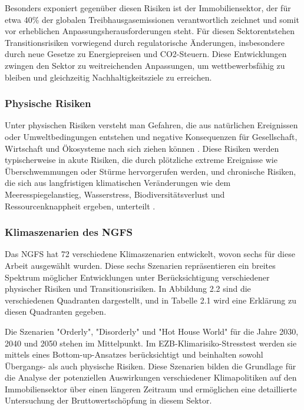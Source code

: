 Besonders exponiert gegenüber diesen Risiken ist der Immobiliensektor, der für etwa 40\% der globalen Treibhausgasemissionen verantwortlich zeichnet \parencite{unepfi2023realestate} und somit vor erheblichen Anpassungsherausforderungen steht.
Für diesen Sektorentstehen Transitionsrisiken vorwiegend durch regulatorische Änderungen, insbesondere durch neue Gesetze zu Energiepreisen und CO2-Steuern. Diese Entwicklungen zwingen den Sektor zu weitreichenden Anpassungen, um wettbewerbsfähig zu bleiben und gleichzeitig Nachhaltigkeitsziele zu erreichen.
\subsubsection{Physische Risiken}
Unter physischen Risiken versteht man Gefahren, die aus natürlichen Ereignissen oder Umweltbedingungen entstehen und negative Konsequenzen für Gesellschaft, Wirtschaft und Ökosysteme nach sich ziehen können \parencite{greenvisionsolutions_transitorische_2024}. Diese Risiken werden typischerweise in akute Risiken, die durch plötzliche extreme Ereignisse wie Überschwemmungen oder Stürme hervorgerufen werden, und chronische Risiken, die sich aus langfristigen klimatischen Veränderungen wie dem Meeresspiegelanstieg, Wasserstress, Biodiversitätsverlust und Ressourcenknappheit ergeben, unterteilt \parencite{dnb2019values}.

\subsubsection{Klimaszenarien des NGFS}
Das \ac{NGFS} hat 72 verschiedene Klimaszenarien entwickelt, wovon sechs für diese Arbeit ausgewählt wurden. Diese sechs Szenarien repräsentieren ein breites Spektrum möglicher Entwicklungen unter Berücksichtigung verschiedener physischer Risiken und Transitionsrisiken. In Abbildung 2.2 sind die verschiedenen Quadranten dargestellt, und in Tabelle 2.1 wird eine Erklärung zu diesen Quadranten gegeben.

Die Szenarien "Orderly", "Disorderly" und "Hot House World" für die Jahre 2030, 2040 und 2050 stehen im Mittelpunkt. Im EZB-Klimarisiko-Stresstest werden sie mittels eines Bottom-up-Ansatzes berücksichtigt und beinhalten sowohl Übergangs- als auch physische Risiken. Diese Szenarien bilden die Grundlage für die Analyse der potenziellen Auswirkungen verschiedener Klimapolitiken auf den Immobiliensektor über einen längeren Zeitraum und ermöglichen eine detaillierte Untersuchung der Bruttowertschöpfung in diesem Sektor.

